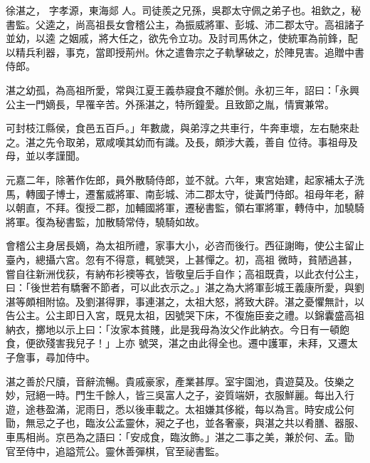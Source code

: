 
\begin{pinyinscope}

 徐湛之，
 字孝源，東海郯
 人。司徒羨之兄孫，吳郡太守佩之弟子也。祖欽之，秘書監。父逵之，尚高祖長女會稽公主，為振威將軍、彭城、沛二郡太守。高祖諸子並幼，以逵
 之姻戚，將大任之，欲先令立功。及討司馬休之，使統軍為前鋒，配以精兵利器，事克，當即授荊州。休之遣魯宗之子軌擊破之，於陣見害。追贈中書侍郎。



 湛之幼孤，為高祖所愛，常與江夏王義恭寢食不離於側。永初三年，詔曰：「永興公主一門嫡長，早罹辛苦。外孫湛之，特所鐘愛。且致節之胤，情實兼常。



 可封枝江縣侯，食邑五百戶。」年數歲，與弟淳之共車行，牛奔車壞，左右馳來赴之。湛之先令取弟，眾咸嘆其幼而有識。及長，頗涉大義，善自
 位待。事祖母及母，並以孝謹聞。



 元嘉二年，除著作佐郎，員外散騎侍郎，並不就。六年，東宮始建，起家補太子洗馬，轉國子博士，遷奮威將軍、南彭城、沛二郡太守，徙黃門侍郎。祖母年老，辭以朝直，不拜。復授二郡，加輔國將軍，遷秘書監，領右軍將軍，轉侍中，加驍騎將軍。復為秘書監，加散騎常侍，驍騎如故。



 會稽公主身居長嫡，為太祖所禮，家事大小，必咨而後行。西征謝晦，使公主留止臺內，總攝六宮。忽有不得意，輒號哭，上甚憚之。初，高祖
 微時，貧陋過甚，嘗自往新洲伐荻，有納布衫襖等衣，皆敬皇后手自作；高祖既貴，以此衣付公主，曰：「後世若有驕奢不節者，可以此衣示之。」湛之為大將軍彭城王義康所愛，與劉湛等頗相附協。及劉湛得罪，事連湛之，太祖大怒，將致大辟。湛之憂懼無計，以告公主。公主即日入宮，既見太祖，因號哭下床，不復施臣妾之禮。以錦囊盛高祖納衣，擲地以示上曰：「汝家本貧賤，此是我母為汝父作此納衣。今日有一頓飽食，便欲殘害我兒子！」上亦
 號哭，湛之由此得全也。遷中護軍，未拜，又遷太子詹事，尋加侍中。



 湛之善於尺牘，音辭流暢。貴戚豪家，產業甚厚。室宇園池，貴遊莫及。伎樂之妙，冠絕一時。門生千餘人，皆三吳富人之子，姿質端妍，衣服鮮麗。每出入行遊，途巷盈滿，泥雨日，悉以後車載之。太祖嫌其侈縱，每以為言。時安成公何勖，無忌之子也，臨汝公孟靈休，昶之子也，並各奢豪，與湛之共以肴膳、器服、車馬相尚。京邑為之語曰：「安成食，臨汝飾。」湛之二事之美，兼於何、孟。勖
 官至侍中，追謚荒公。靈休善彈棋，官至祕書監。




\end{pinyinscope}
